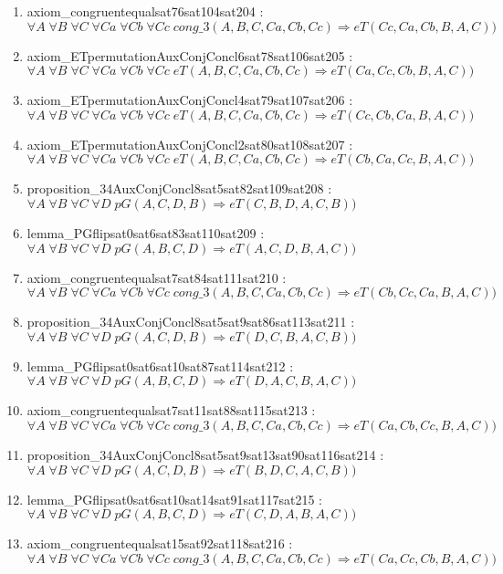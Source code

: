 \documentclass{article}
\begin{document}
\begin{enumerate}
\item axiom\_congruentequalsat76sat104sat204 : $\forall A\;\forall B\;\forall C\;\forall Ca\;\forall Cb\;\forall Cc\;cong\_3(A, B, C, Ca, Cb, Cc) \Rightarrow eT(Cc, Ca, Cb, B, A, C))$
\item axiom\_ETpermutationAuxConjConcl6sat78sat106sat205 : $\forall A\;\forall B\;\forall C\;\forall Ca\;\forall Cb\;\forall Cc\;eT(A, B, C, Ca, Cb, Cc) \Rightarrow eT(Ca, Cc, Cb, B, A, C))$
\item axiom\_ETpermutationAuxConjConcl4sat79sat107sat206 : $\forall A\;\forall B\;\forall C\;\forall Ca\;\forall Cb\;\forall Cc\;eT(A, B, C, Ca, Cb, Cc) \Rightarrow eT(Cc, Cb, Ca, B, A, C))$
\item axiom\_ETpermutationAuxConjConcl2sat80sat108sat207 : $\forall A\;\forall B\;\forall C\;\forall Ca\;\forall Cb\;\forall Cc\;eT(A, B, C, Ca, Cb, Cc) \Rightarrow eT(Cb, Ca, Cc, B, A, C))$
\item proposition\_34AuxConjConcl8sat5sat82sat109sat208 : $\forall A\;\forall B\;\forall C\;\forall D\;pG(A, C, D, B) \Rightarrow eT(C, B, D, A, C, B))$
\item lemma\_PGflipsat0sat6sat83sat110sat209 : $\forall A\;\forall B\;\forall C\;\forall D\;pG(A, B, C, D) \Rightarrow eT(A, C, D, B, A, C))$
\item axiom\_congruentequalsat7sat84sat111sat210 : $\forall A\;\forall B\;\forall C\;\forall Ca\;\forall Cb\;\forall Cc\;cong\_3(A, B, C, Ca, Cb, Cc) \Rightarrow eT(Cb, Cc, Ca, B, A, C))$
\item proposition\_34AuxConjConcl8sat5sat9sat86sat113sat211 : $\forall A\;\forall B\;\forall C\;\forall D\;pG(A, C, D, B) \Rightarrow eT(D, C, B, A, C, B))$
\item lemma\_PGflipsat0sat6sat10sat87sat114sat212 : $\forall A\;\forall B\;\forall C\;\forall D\;pG(A, B, C, D) \Rightarrow eT(D, A, C, B, A, C))$
\item axiom\_congruentequalsat7sat11sat88sat115sat213 : $\forall A\;\forall B\;\forall C\;\forall Ca\;\forall Cb\;\forall Cc\;cong\_3(A, B, C, Ca, Cb, Cc) \Rightarrow eT(Ca, Cb, Cc, B, A, C))$
\item proposition\_34AuxConjConcl8sat5sat9sat13sat90sat116sat214 : $\forall A\;\forall B\;\forall C\;\forall D\;pG(A, C, D, B) \Rightarrow eT(B, D, C, A, C, B))$
\item lemma\_PGflipsat0sat6sat10sat14sat91sat117sat215 : $\forall A\;\forall B\;\forall C\;\forall D\;pG(A, B, C, D) \Rightarrow eT(C, D, A, B, A, C))$
\item axiom\_congruentequalsat15sat92sat118sat216 : $\forall A\;\forall B\;\forall C\;\forall Ca\;\forall Cb\;\forall Cc\;cong\_3(A, B, C, Ca, Cb, Cc) \Rightarrow eT(Ca, Cc, Cb, B, A, C))$

\end{enumerate}
\end{document}
